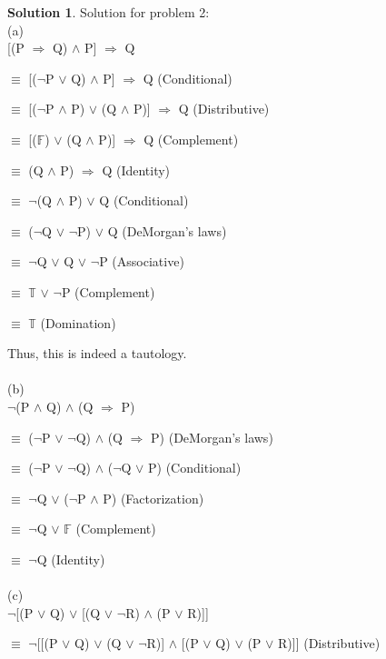 \documentclass{article}
\theoremstyle{definition}
\newtheorem*{solution}{Solution}
\begin{document}
\begin{solution}
Solution for problem 2:\\

(a)\\

[(P \(\Rightarrow\) Q) \(\wedge\) P] \(\Rightarrow\) Q

\(\equiv\) [(\(\neg\)P \(\vee\) Q) \(\wedge\) P] \(\Rightarrow\) Q (Conditional)

\(\equiv\) [(\(\neg\)P \(\wedge\) P) \(\vee\) (Q \(\wedge\) P)] \(\Rightarrow\) Q (Distributive)

\(\equiv\) [(\(\mathbb{F}\)) \(\vee\) (Q \(\wedge\) P)] \(\Rightarrow\) Q (Complement)

\(\equiv\) (Q \(\wedge\) P) \(\Rightarrow\) Q (Identity)

\(\equiv\) \(\neg\)(Q \(\wedge\) P) \(\vee\) Q (Conditional)

\(\equiv\) (\(\neg\)Q \(\vee\) \(\neg\)P) \(\vee\) Q (DeMorgan's laws)

\(\equiv\) \(\neg\)Q \(\vee\) Q \(\vee\) \(\neg\)P (Associative)

\(\equiv\) \(\mathbb{T}\) \(\vee\) \(\neg\)P (Complement)

\(\equiv\) \(\mathbb{T}\) (Domination)

Thus, this is indeed a tautology.\\\\

(b)\\

\(\neg\)(P \(\wedge\) Q) \(\wedge\) (Q \(\Rightarrow\) P)

\(\equiv\) (\(\neg\)P \(\vee\) \(\neg\)Q) \(\wedge\) (Q \(\Rightarrow\) P) (DeMorgan's laws)

\(\equiv\) (\(\neg\)P \(\vee\) \(\neg\)Q) \(\wedge\) (\(\neg\)Q \(\vee\) P) (Conditional)

\(\equiv\) \(\neg\)Q \(\vee\) (\(\neg\)P \(\wedge\) P) (Factorization)

\(\equiv\) \(\neg\)Q \(\vee\) \(\mathbb{F}\) (Complement)

\(\equiv\) \(\neg\)Q (Identity)\\\\

(c)\\

\(\neg\)[(P \(\vee\) Q) \(\vee\) [(Q \(\vee\) \(\neg\)R) \(\wedge\) (P \(\vee\) R)]]

\(\equiv\) \(\neg\)[[(P \(\vee\) Q) \(\vee\) (Q \(\vee\) \(\neg\)R)] \(\wedge\) [(P \(\vee\) Q) \(\vee\) (P \(\vee\) R)]] (Distributive)


\end{solution}
\end{document}
